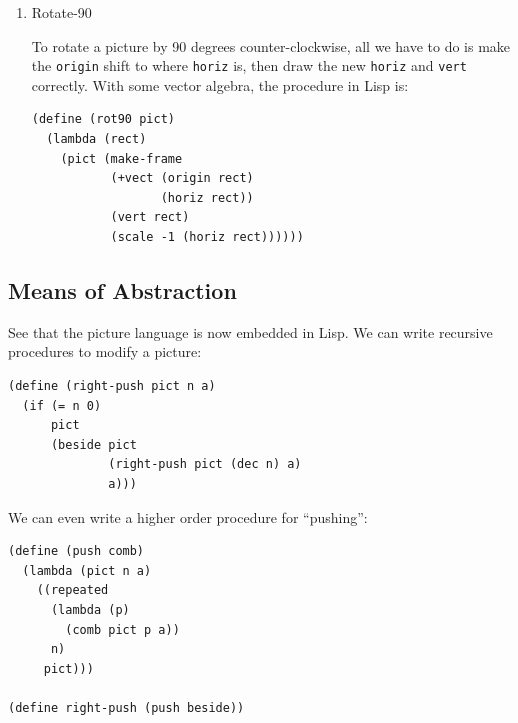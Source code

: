 \documentclass[9pt]{report}
\begin{document}
\begin{enumerate}
\begin{verbatim}
(define (beside p1 p2 a)
  (lambda (rect)
    (p1 (make-frame
         (origin rect)
         (scale a (horiz rect))
         (vert rect)))
    (p2 (make-frame
         (+vect (origin rect)
                (scale a (horiz rect)))
         (scale (-1 a) (horiz rect))
         (vert rect)))))
\end{verbatim}

\item Rotate-90
\label{sec:orgc43ebbd}

To rotate a picture by 90 degrees counter-clockwise, all we have
to do is make the \texttt{origin} shift to where \texttt{horiz} is, then draw
the new \texttt{horiz} and \texttt{vert} correctly. With some vector algebra,
the procedure in Lisp is:

\begin{verbatim}
(define (rot90 pict)
  (lambda (rect)
    (pict (make-frame
           (+vect (origin rect)
                  (horiz rect))
           (vert rect)
           (scale -1 (horiz rect))))))
\end{verbatim}
\end{enumerate}


\subsection{Means of Abstraction}
\label{sec:orgbbd013c}
See that the picture language is now embedded in Lisp. We can
write recursive procedures to modify a picture:

\begin{verbatim}
(define (right-push pict n a)
  (if (= n 0)
      pict
      (beside pict
              (right-push pict (dec n) a)
              a)))
\end{verbatim}

We can even write a higher order procedure for ``pushing'':
\begin{verbatim}
(define (push comb)
  (lambda (pict n a)
    ((repeated
      (lambda (p)
        (comb pict p a))
      n)
     pict)))

(define right-push (push beside))
\end{verbatim}
\end{document}
